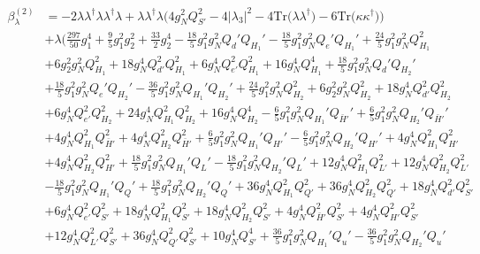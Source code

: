 {\begin{align}
\beta_{\lambda}^{(2)} & =  
-2 {\lambda  \lambda^{\dagger}  \lambda  \lambda^{\dagger}  \lambda} +{\lambda  \lambda^{\dagger}  \lambda} \Big(4 g_{N}^{2} Q_{S'}^{2}  -4 |\lambda_3|^2  -4 \mbox{Tr}\Big({\lambda  \lambda^{\dagger}}\Big)  -6 \mbox{Tr}\Big({\kappa  \kappa^{\dagger}}\Big) \Big)\nonumber \\ 
 &+\lambda \Big(\frac{297}{50} g_{1}^{4} +\frac{9}{5} g_{1}^{2} g_{2}^{2} +\frac{33}{2} g_{2}^{4} -\frac{18}{5} g_{1}^{2} g_{N}^{2} Q_d' Q_{H_1}' -\frac{18}{5} g_{1}^{2} g_{N}^{2} Q_e' Q_{H_1}' +\frac{24}{5} g_{1}^{2} g_{N}^{2} Q_{H_1}^{2} \nonumber \\ 
 &+6 g_{2}^{2} g_{N}^{2} Q_{H_1}^{2} +18 g_{N}^{4} Q_{d'}^{2} Q_{H_1}^{2} +6 g_{N}^{4} Q_{e'}^{2} Q_{H_1}^{2} +16 g_{N}^{4} Q_{H_1}^{4} +\frac{18}{5} g_{1}^{2} g_{N}^{2} Q_d' Q_{H_2}' \nonumber \\ 
 &+\frac{18}{5} g_{1}^{2} g_{N}^{2} Q_e' Q_{H_2}' -\frac{36}{5} g_{1}^{2} g_{N}^{2} Q_{H_1}' Q_{H_2}' +\frac{24}{5} g_{1}^{2} g_{N}^{2} Q_{H_2}^{2} +6 g_{2}^{2} g_{N}^{2} Q_{H_2}^{2} +18 g_{N}^{4} Q_{d'}^{2} Q_{H_2}^{2} \nonumber \\ 
 &+6 g_{N}^{4} Q_{e'}^{2} Q_{H_2}^{2} +24 g_{N}^{4} Q_{H_1}^{2} Q_{H_2}^{2} +16 g_{N}^{4} Q_{H_2}^{4} -\frac{6}{5} g_{1}^{2} g_{N}^{2} Q_{H_1}' Q_{\bar{H}'}' +\frac{6}{5} g_{1}^{2} g_{N}^{2} Q_{H_2}' Q_{\bar{H}'}' \nonumber \\ 
 &+4 g_{N}^{4} Q_{H_1}^{2} Q_{\bar{H}'}^{2} +4 g_{N}^{4} Q_{H_2}^{2} Q_{\bar{H}'}^{2} +\frac{6}{5} g_{1}^{2} g_{N}^{2} Q_{H_1}' Q_{H'}' -\frac{6}{5} g_{1}^{2} g_{N}^{2} Q_{H_2}' Q_{H'}' +4 g_{N}^{4} Q_{H_1}^{2} Q_{H'}^{2} \nonumber \\ 
 &+4 g_{N}^{4} Q_{H_2}^{2} Q_{H'}^{2} +\frac{18}{5} g_{1}^{2} g_{N}^{2} Q_{H_1}' Q_L' -\frac{18}{5} g_{1}^{2} g_{N}^{2} Q_{H_2}' Q_L' +12 g_{N}^{4} Q_{H_1}^{2} Q_{L'}^{2} +12 g_{N}^{4} Q_{H_2}^{2} Q_{L'}^{2} \nonumber \\ 
 &-\frac{18}{5} g_{1}^{2} g_{N}^{2} Q_{H_1}' Q_Q' +\frac{18}{5} g_{1}^{2} g_{N}^{2} Q_{H_2}' Q_Q' +36 g_{N}^{4} Q_{H_1}^{2} Q_{Q'}^{2} +36 g_{N}^{4} Q_{H_2}^{2} Q_{Q'}^{2} +18 g_{N}^{4} Q_{d'}^{2} Q_{S'}^{2} \nonumber \\ 
 &+6 g_{N}^{4} Q_{e'}^{2} Q_{S'}^{2} +18 g_{N}^{4} Q_{H_1}^{2} Q_{S'}^{2} +18 g_{N}^{4} Q_{H_2}^{2} Q_{S'}^{2} +4 g_{N}^{4} Q_{\bar{H}'}^{2} Q_{S'}^{2} +4 g_{N}^{4} Q_{H'}^{2} Q_{S'}^{2} \nonumber \\ 
 &+12 g_{N}^{4} Q_{L'}^{2} Q_{S'}^{2} +36 g_{N}^{4} Q_{Q'}^{2} Q_{S'}^{2} +10 g_{N}^{4} Q_{S'}^{4} +\frac{36}{5} g_{1}^{2} g_{N}^{2} Q_{H_1}' Q_u' -\frac{36}{5} g_{1}^{2} g_{N}^{2} Q_{H_2}' Q_u' \nonumber \\ 

\end{align}}
